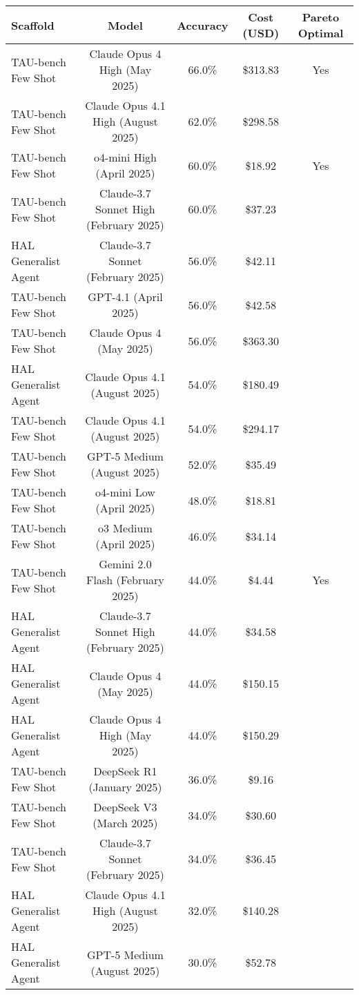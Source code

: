 \begin{tabular}{lcccc}
\toprule
Scaffold & Model & Accuracy & Cost (USD) & Pareto Optimal \\
\midrule
TAU-bench Few Shot & Claude Opus 4 High (May 2025) & 66.0\% & \$313.83 & Yes \\
TAU-bench Few Shot & Claude Opus 4.1 High (August 2025) & 62.0\% & \$298.58 &  \\
TAU-bench Few Shot & o4-mini High (April 2025) & 60.0\% & \$18.92 & Yes \\
TAU-bench Few Shot & Claude-3.7 Sonnet High (February 2025) & 60.0\% & \$37.23 &  \\
HAL Generalist Agent & Claude-3.7 Sonnet (February 2025) & 56.0\% & \$42.11 &  \\
TAU-bench Few Shot & GPT-4.1 (April 2025) & 56.0\% & \$42.58 &  \\
TAU-bench Few Shot & Claude Opus 4 (May 2025) & 56.0\% & \$363.30 &  \\
HAL Generalist Agent & Claude Opus 4.1 (August 2025) & 54.0\% & \$180.49 &  \\
TAU-bench Few Shot & Claude Opus 4.1 (August 2025) & 54.0\% & \$294.17 &  \\
TAU-bench Few Shot & GPT-5 Medium (August 2025) & 52.0\% & \$35.49 &  \\
TAU-bench Few Shot & o4-mini Low (April 2025) & 48.0\% & \$18.81 &  \\
TAU-bench Few Shot & o3 Medium (April 2025) & 46.0\% & \$34.14 &  \\
TAU-bench Few Shot & Gemini 2.0 Flash (February 2025) & 44.0\% & \$4.44 & Yes \\
HAL Generalist Agent & Claude-3.7 Sonnet High (February 2025) & 44.0\% & \$34.58 &  \\
HAL Generalist Agent & Claude Opus 4 (May 2025) & 44.0\% & \$150.15 &  \\
HAL Generalist Agent & Claude Opus 4 High (May 2025) & 44.0\% & \$150.29 &  \\
TAU-bench Few Shot & DeepSeek R1 (January 2025) & 36.0\% & \$9.16 &  \\
TAU-bench Few Shot & DeepSeek V3 (March 2025) & 34.0\% & \$30.60 &  \\
TAU-bench Few Shot & Claude-3.7 Sonnet (February 2025) & 34.0\% & \$36.45 &  \\
HAL Generalist Agent & Claude Opus 4.1 High (August 2025) & 32.0\% & \$140.28 &  \\
HAL Generalist Agent & GPT-5 Medium (August 2025) & 30.0\% & \$52.78 &  \\

\end{tabular}
